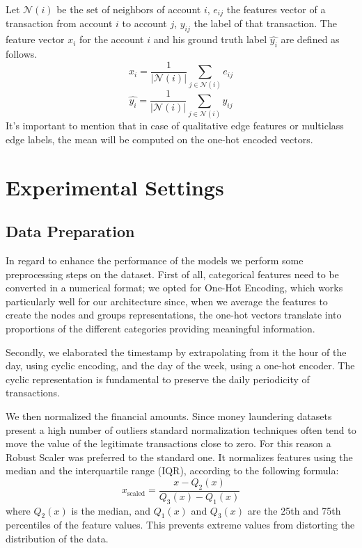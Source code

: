 Let \(\mathcal{N}(i)\) be the set of neighbors of account \(i\), \(e_{ij}\) the features vector of a transaction from account \(i\) to account \(j\), \(y_{ij}\) the label of that transaction. The feature vector \(x_i\) for the account \(i\) and his ground truth label \(\widehat{y_i}\) are defined as follows.
\begin{equation}
    x_i = \frac{1}{|\mathcal{N}(i)|} \sum_{j \in \mathcal{N}(i)} e_{ij}
\end{equation}
\begin{equation}
  \widehat{y_i} = \frac{1}{|\mathcal{N}(i)|} \sum_{j \in \mathcal{N}(i)} y_{ij}
\end{equation}
It's important to mention that in case of qualitative edge features or multiclass edge labels, the mean will be computed on the one-hot encoded vectors.


\section{Experimental Settings}

\subsection{Data Preparation}\label{dataprep}
In regard to enhance the performance of the models we perform some preprocessing steps on the dataset.
First of all, categorical features need to be converted in a numerical format; we opted for One-Hot Encoding, which works particularly well for our architecture since, when we average the features to create the nodes and groups representations, the one-hot vectors translate into proportions of the different categories providing meaningful information. 

Secondly, we elaborated the timestamp by extrapolating from it the hour of the day, using cyclic encoding, and the day of the week, using a one-hot encoder. The cyclic representation is fundamental to preserve the daily periodicity of transactions.

We then normalized the financial amounts. Since money laundering datasets present a high number of outliers standard normalization techniques often tend to move the value of the legitimate transactions close to zero. For this reason a Robust Scaler was preferred to the standard one. It normalizes features using the median and the interquartile range (IQR), according to the following formula:
\begin{equation}
    x_{\text{scaled}} = \frac{x - Q_2(x)}{Q_3(x) - Q_1(x)}
\end{equation}
where $Q_2(x)$ is the median, and $Q_1(x)$ and $Q_3(x)$ are the 25th and 75th percentiles of the feature values. This prevents extreme values from distorting the distribution of the data.

